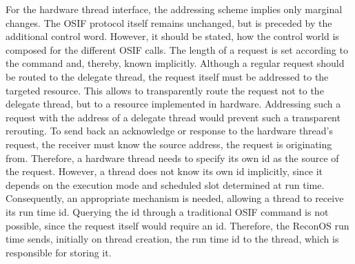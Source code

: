 For the hardware thread interface, the addressing scheme implies only marginal
changes. The \ac{OSIF} protocol itself remains unchanged, but is preceded by
the additional control word. However, it should be stated, how the control
world is composed for the different \ac{OSIF} calls. The length of a request
is set according to the command and, thereby, known implicitly. Although a
regular request should be routed to the delegate thread, the request itself
must be addressed to the targeted resource. This allows to transparently route
the request not to the delegate thread, but to a resource implemented in
hardware. Addressing such a request with the address of a delegate thread
would prevent such a transparent rerouting. To send back an acknowledge or
response to the hardware thread's request, the receiver must know the source
address, the request is originating from. Therefore, a hardware thread needs
to specify its own id as the source of the request. However, a thread does not
know its own id implicitly, since it depends on the execution mode and
scheduled slot determined at run time. Consequently, an appropriate mechanism
is needed, allowing a thread to receive its run time id. Querying the id
through a traditional \ac{OSIF} command is not possible, since the request
itself would require an id. Therefore, the ReconOS run time sends, initially on
thread creation, the run time id to the thread, which is responsible for
storing it.


